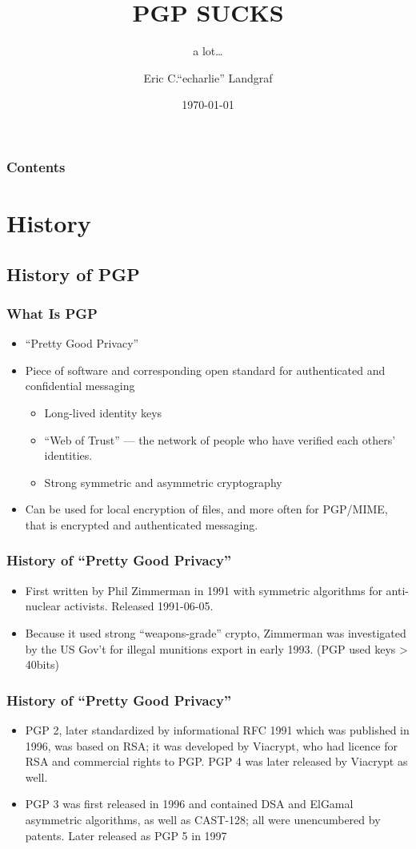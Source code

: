 \documentclass[aspectratio=1610,bigger,utf8]{beamer}
\title{PGP SUCKS}
\subtitle{a lot\ldots}
\author{Eric C.``echarlie'' Landgraf}
\institute{VTLUUG}
\date{\today}
\begin{document}
\frame{\titlepage}

\begin{frame}
	\frametitle{Contents}
	\tableofcontents[hideallsubsections]

\end{frame}

\section{History}
\subsection{History of PGP}
\begin{frame}
	\frametitle{What Is PGP}
	\begin{itemize}
		\item ``Pretty Good Privacy''
		\item Piece of software and corresponding open standard for
			authenticated and confidential messaging
			\begin{itemize}
				\item Long-lived identity keys
				\item ``Web of Trust'' --- the network of
					people who have verified each others'
					identities.
				\item Strong symmetric and asymmetric
					cryptography
			\end{itemize}
		\item Can be used for local encryption of files, and more often
			for PGP/MIME, that is encrypted and authenticated
			messaging.
	\end{itemize}
\end{frame}
\begin{frame}
	\frametitle{History of ``Pretty Good Privacy''}
	\begin{itemize}
		\item First written by Phil Zimmerman in 1991 with symmetric
			algorithms for anti-nuclear activists. Released
			1991-06-05.
		\item Because it used strong ``weapons-grade'' crypto,
			Zimmerman was investigated by the US Gov't for illegal
			munitions export in early 1993. (PGP used keys >
			40bits)
	\end{itemize}
\end{frame}
\begin{frame}
	\frametitle{History of ``Pretty Good Privacy''}
	\begin{itemize}
		\item PGP 2, later standardized by informational \alert{RFC
			1991} which was published in 1996, was based on RSA; it
			was developed by Viacrypt, who had licence for RSA and
			commercial rights to PGP. PGP 4 was later released by
			Viacrypt as well.
		\item PGP 3 was first released in 1996 and contained DSA and
			ElGamal asymmetric algorithms, as well as CAST-128; all
			were unencumbered by patents. Later released as PGP 5
			in 1997
	\end{itemize}
\end{frame}
\end{document}
